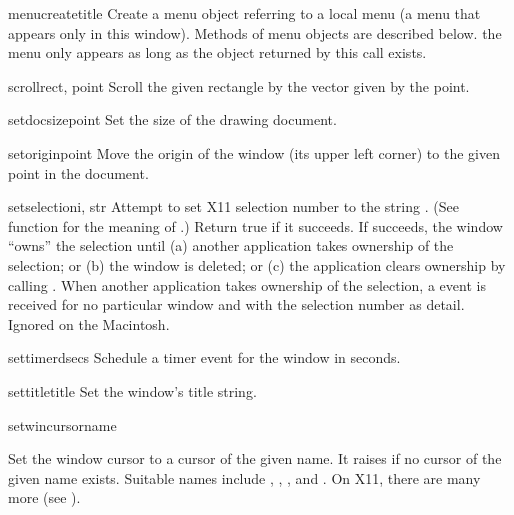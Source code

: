 \begin{methoddesc}[window]{menucreate}{title}
Create a menu object referring to a local menu (a menu that appears
only in this window).
Methods of menu objects are described below.
 the menu only appears as long as the object
returned by this call exists.
\end{methoddesc}

\begin{methoddesc}[window]{scroll}{rect, point}
Scroll the given rectangle by the vector given by the point.
\end{methoddesc}

\begin{methoddesc}[window]{setdocsize}{point}
Set the size of the drawing document.
\end{methoddesc}

\begin{methoddesc}[window]{setorigin}{point}
Move the origin of the window (its upper left corner)
to the given point in the document.
\end{methoddesc}

\begin{methoddesc}[window]{setselection}{i, str}
Attempt to set X11 selection number  to the string .
(See  function  for the
meaning of .)  Return true if it succeeds.
If  succeeds, the window ``owns'' the selection until
(a) another application takes ownership of the selection; or
(b) the window is deleted; or
(c) the application clears ownership by calling
.  When another application
takes ownership of the selection, a  event is
received for no particular window and with the selection number as
detail.  Ignored on the Macintosh.
\end{methoddesc}

\begin{methoddesc}[window]{settimer}{dsecs}
Schedule a timer event for the window in 
seconds.
\end{methoddesc}

\begin{methoddesc}[window]{settitle}{title}
Set the window's title string.
\end{methoddesc}

\begin{methoddesc}[window]{setwincursor}{name}
\begin{sloppypar}
Set the window cursor to a cursor of the given name.  It raises
 if no cursor of the given name exists.
Suitable names include
,
,
,
and
.
On X11, there are many more (see ).
\end{sloppypar}
\end{methoddesc}

